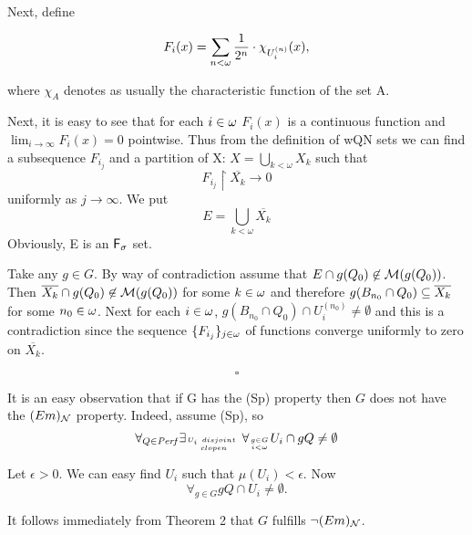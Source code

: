 Next, define

\[
F_i(x) = \sum_{n < \omega} {1 \over 2^n} \cdot \chi_{U^{(n)}_i} (x),
\]

where $\chi_A$ denotes as usually the characteristic function of the set A.

Next, it is easy to see that for each $i\in\omega$ $F_i(x)$ is
a continuous function and
$\lim_{i \rightarrow \infty} F_i(x) = 0$
pointwise.
  Thus from the definition of wQN sets we can find a subsequence
$F_{i_j}$ and a partition of X:
$X = \bigcup_{k<\omega} X_k $
such that $$F_{i_j} \restriction \overline{ X_k} \rightarrow 0$$
uniformly as $j \rightarrow \infty$.
  We put
  \[ E = \bigcup_{k<\omega} \overline{X_k} \]
Obviously, E is an ${\sf F}_{\sigma}$ set.

Take any $g \in G$.
By way of contradiction assume that
$E \cap g(Q_0) \not\in {\cal M}(g(Q_0))$.
Then $\overline{X_k} \cap g(Q_0) \not\in {\cal M}(g(Q_0))$
for some $k \in \omega$ and therefore
$g(B_{n_0} \cap Q_0) \subseteq \overline{X_k}$
for some $n_0 \in \omega$.
  Next for each $i \in \omega$,
$g(B_{n_0} \cap Q_0) \cap U^{(n_0)}_i \not= \emptyset$
and this is a contradiction since the sequence
$\lbrace F_{i_j} \rbrace_{j \in \omega}$ of functions converge
uniformly to zero on $\overline{X_k}$.


\smallskip
  \[ \square \]


\bigskip
\bigskip

  It is an easy observation that if G has the (Sp) property
then $G$ does not have the $(Em)_{{\cal N}}$ property.
Indeed, assume (Sp), so
\[ \forall_{Q \in \perf} \exists_{U_i\ disjoint\ \atop clopen }

\forall_{g \in G \atop i < \omega} U_i \cap gQ \not = \emptyset \]

 Let $\epsilon > 0$.
We can easy find $U_i$ such that $\mu (U_i) < \epsilon$.
Now
\[ \forall_{g \in G} gQ \cap U_i \not = \emptyset. \]

It follows immediately from Theorem 2 that
$G$ fulfills $\neg (Em)_{{\cal N}}$.

